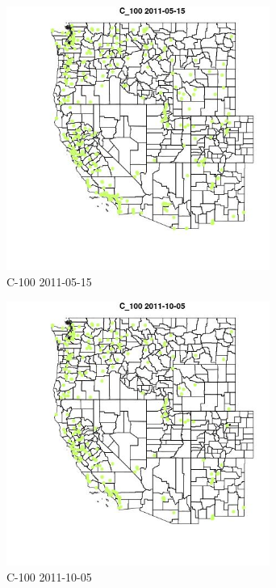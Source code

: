 \begin{figure} 
\centering  
\includegraphics[width=0.77\textwidth]{Code_Outputs/ML_input_report_ML_input_PM25_Step5_part_d_de_duplicated_aves_ML_input_MapObsC_1002011-05-15.jpg} 
\caption{\label{fig:ML_input_report_ML_input_PM25_Step5_part_d_de_duplicated_aves_ML_inputMapObsC_1002011-05-15}C-100 2011-05-15} 
\end{figure} 
 

\begin{figure} 
\centering  
\includegraphics[width=0.77\textwidth]{Code_Outputs/ML_input_report_ML_input_PM25_Step5_part_d_de_duplicated_aves_ML_input_MapObsC_1002011-10-05.jpg} 
\caption{\label{fig:ML_input_report_ML_input_PM25_Step5_part_d_de_duplicated_aves_ML_inputMapObsC_1002011-10-05}C-100 2011-10-05} 
\end{figure} 
 

